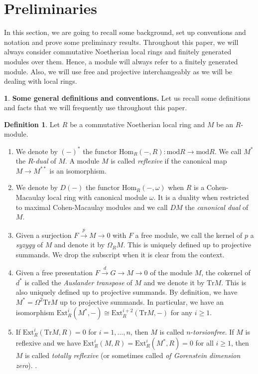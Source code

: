 \documentclass[12pt]{amsart}
\newcommand{\Ext}{\mathrm{Ext}}
\newcommand{\Hom}{\mathrm{Hom}}
\newcommand{\module}{\mathrm{mod}}
\theoremstyle{definition}
\newtheorem{definition}[theorem]{Definition}
\newtheorem{chunk}[theorem]{}
\numberwithin{equation}{theorem}
\newcommand{\Tr}{\mathrm{Tr}}
\begin{document}
\section{Preliminaries}
In this section, we are going to recall some background, set up conventions and notation and prove some preliminary results. Throughout this paper, we will always consider commutative Noetherian local rings and finitely generated modules over them. Hence, a module will always refer to a finitely generated module. Also, we will use free and projective interchangeably as we will be dealing with local rings.
\begin{chunk}
    \textbf{Some general definitions and conventions.} 
    Let us recall some definitions and facts that we will frequently use throughout this paper.
\begin{definition}\label{general-definitions}
    Let $R$ be a commutative Noetherian local ring and $M$ be an $R$-module. 
    \begin{enumerate}
        \item We denote by $(-)^*$ the functor $\Hom_R(-,R) \colon \module R \to \module R$. We call $M^*$ the $R$-\textit{dual} of $M$. A module $M$ is called \textit{reflexive} if the canonical map $M \to M^{**}$ is an isomorphism. 
        \item We denote by $D(-)$ the functor $\Hom_R(-,\omega)$ when $R$ is a Cohen-Macaulay local ring with canonical module $\omega$. It is a duality when restricted to maximal Cohen-Macaulay modules and we call $DM$ the \textit{canonical dual} of $M$.
        \item Given a surjection $F \xrightarrow{p} M \to 0$ with $F$ a free module, we call the kernel of $p$ a \textit{syzygy} of $M$ and denote it by $\Omega_R M$. This is uniquely defined up to projective summands. We drop the subscript when it is clear from the context.
        \item Given a free presentation $F \xrightarrow{d} G \to M \to 0$ of the module $M$, the cokernel of $d^*$ is called the \textit{Auslander transpose} of $M$ and we denote it by $\Tr M$. This is also uniquely defined up to projective summands. By definition, we have $M^* = \Omega^2 \Tr M $ up to projective summands. In particular, we have an isomorphism $\Ext_R^i(M^*, -) \cong \Ext_R^{i+2}(\Tr M, -)$ for any $i \geq 1$.
        \item If $\Ext_R^i(\Tr M, R) = 0$ for $i = 1, \ldots, n$, then $M$ is called $n$-\textit{torsionfree}. If $M$ is reflexive and we have $\Ext_R^i(M,R) = \Ext_R^i(M^*,R) = 0$ for all $i \geq 1$, then $M$ is called \textit{totally reflexive} (or sometimes called \textit{of Gorenstein dimension zero}). \cite{Auslander-Bridger}.
    \end{enumerate}
\end{definition}
\end{chunk}
\end{document}
